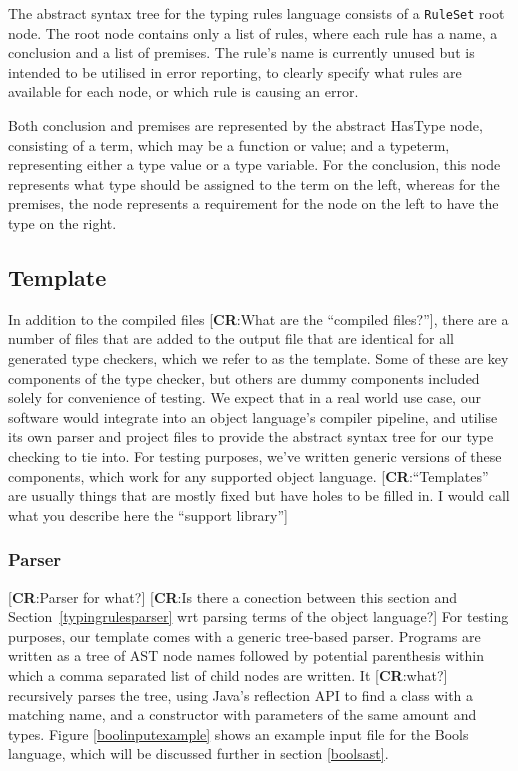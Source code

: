 \documentclass[nofilelist]{cslthse-msc}
\newcommand{\CR}[1]{\textcolor{green!60!black}{[\textbf{CR}:#1]}}
\begin{document}
The abstract syntax tree for the typing rules language consists of a \lstinline{RuleSet} root node.
The root node contains only a list of rules, where each rule has a name, a conclusion and a list of premises.
The rule's name is currently unused but is intended to be utilised in error reporting, to clearly specify what rules are available for each node, or which rule is causing an error.

Both conclusion and premises are represented by the abstract HasType node, consisting of a term, which may be a function or value; and a typeterm, representing either a type value or a type variable.
For the conclusion, this node represents what type should be assigned to the term on the left, whereas for the premises, the node represents a requirement for the node on the left to have the type on the right.

\subsection{Template}
In addition to the compiled files \CR{What are the ``compiled files?''}, there are a number of files that are added to the output file that are identical for all generated type checkers, which we refer to as the template.
Some of these are key components of the type checker, but others are dummy components included solely for convenience of testing.
We expect that in a real world use case, our software would integrate into an object language's compiler pipeline, and utilise its own parser and project files to provide the abstract syntax tree for our type checking to tie into.
For testing purposes, we've written generic versions of these components, which work for any supported object language.
\CR{``Templates'' are usually things that are mostly fixed but have holes to be filled in.  I would call what you describe here the ``support library''}

\subsubsection{Parser}\label{treebasedparser}
\CR{Parser for what?}
\CR{Is there a conection between this section and Section~\ref{typingrulesparser} wrt parsing terms of the object language?}
For testing purposes, our template comes with a generic tree-based parser.
Programs are written as a tree of AST node names followed by potential parenthesis within which a comma separated list of child nodes are written.
It \CR{what?} recursively parses the tree, using Java's reflection API to find a class with a matching name, and a constructor with parameters of the same amount and types.
Figure \ref{boolinputexample} shows an example input file for the Bools language, which will be discussed further in section \ref{boolsast}.
\end{document}
